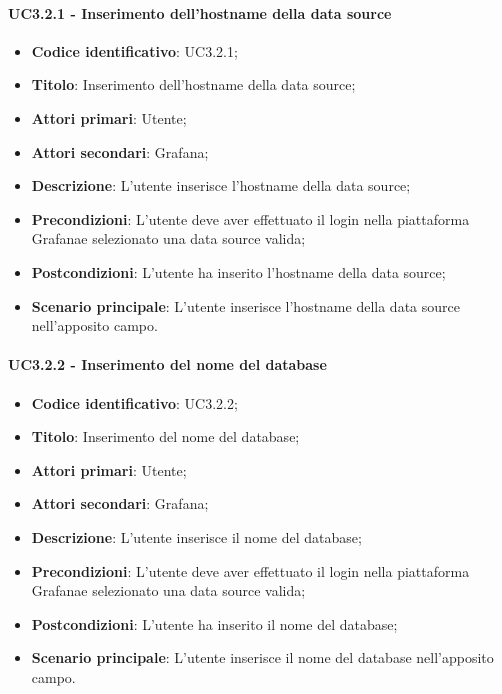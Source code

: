         \paragraph{UC3.2.1 - Inserimento dell'hostname della data source}
            \begin{itemize}
                \item \textbf{Codice identificativo}: UC3.2.1;
                \item \textbf{Titolo}: Inserimento dell'hostname della data source;
                \item \textbf{Attori primari}: Utente;
                \item \textbf{Attori secondari}: Grafana\glo;
                \item \textbf{Descrizione}: L'utente inserisce l'hostname della data source;
                \item \textbf{Precondizioni}: L'utente deve aver effettuato il login nella piattaforma Grafana\glosp e selezionato una data source valida;
                \item \textbf{Postcondizioni}: L'utente ha inserito l'hostname della data source;
                \item \textbf{Scenario principale}: L'utente inserisce l'hostname della data source nell'apposito campo.
            \end{itemize}
        \paragraph{UC3.2.2 - Inserimento del nome del database}
            \begin{itemize}
                \item \textbf{Codice identificativo}: UC3.2.2;
                \item \textbf{Titolo}: Inserimento del nome del database;
                \item \textbf{Attori primari}: Utente;
                \item \textbf{Attori secondari}: Grafana\glo;
                \item \textbf{Descrizione}: L'utente inserisce il nome del database;
                \item \textbf{Precondizioni}: L'utente deve aver effettuato il login nella piattaforma Grafana\glosp e selezionato una data source valida;
                \item \textbf{Postcondizioni}: L'utente ha inserito il nome del database;
                \item \textbf{Scenario principale}: L'utente inserisce il nome del database nell'apposito campo.
            \end{itemize}
